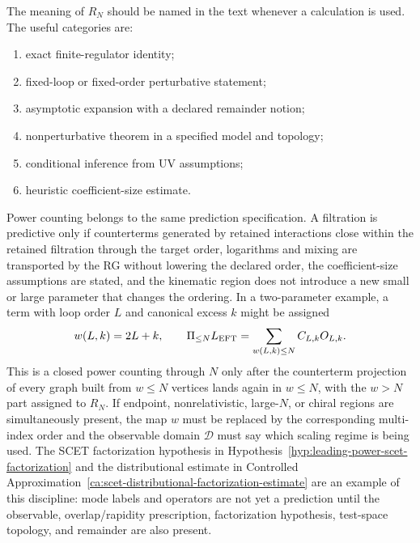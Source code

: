 The meaning of \(R_N\) should be named in the text whenever a calculation is
used.  The useful categories are:
\begin{enumerate}
  \item exact finite-regulator identity;
  \item fixed-loop or fixed-order perturbative statement;
  \item asymptotic expansion with a declared remainder notion;
  \item nonperturbative theorem in a specified model and topology;
  \item conditional inference from UV assumptions;
  \item heuristic coefficient-size estimate.
\end{enumerate}
Power counting belongs to the same prediction specification.  A filtration is
predictive only if
counterterms generated by retained interactions close within the retained
filtration through the target order, logarithms and mixing are transported by
the RG without lowering the declared order, the coefficient-size assumptions
are stated, and the kinematic region does not introduce a new small or large
parameter that changes the ordering.  In a two-parameter example, a term with
loop order \(L\) and canonical excess \(k\) might be assigned
\[
  w(L,k)=2L+k,
  \qquad
  \Pi_{\le N}L_{\rm EFT}
  =
  \sum_{w(L,k)\le N} C_{L,k}O_{L,k}.
\]
This is a closed power counting through \(N\) only after the counterterm
projection of every graph built from \(w\le N\) vertices lands again in
\(w\le N\), with the \(w>N\) part assigned to \(R_N\).  If endpoint,
nonrelativistic, large-\(N\), or chiral regions are simultaneously present,
the map \(w\) must be replaced by the corresponding multi-index order and the
observable domain \(\mathcal D\) must say which scaling regime is being used.
The SCET factorization hypothesis in
Hypothesis~\ref{hyp:leading-power-scet-factorization} and the distributional
estimate in
Controlled Approximation~\ref{ca:scet-distributional-factorization-estimate}
are an example of this discipline: mode labels and operators are not yet a
prediction until the observable, overlap/rapidity prescription, factorization
hypothesis, test-space topology, and remainder are also present.

